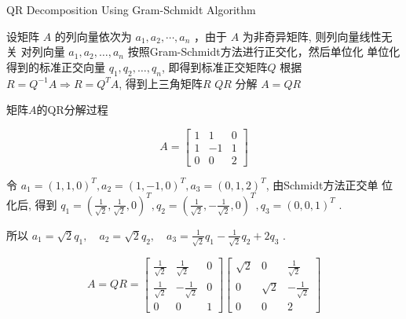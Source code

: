 \begin{algorithm}[htbp]
    \caption{QR Decomposition Using Gram-Schmidt Algorithm}
    
    设矩阵 $ A $ 的列向量依次为 $ a_{1}, a_{2}, \cdots, a_{n} $ ，由于 $ A $ 为非奇异矩阵, 则列向量线性无关\;
    对列向量 $ a_{1}, a_{2}, \ldots, a_{n} $ 按照Gram-Schmidt方法进行正交化，然后单位化\;
    单位化得到的标准正交向量 $ q_{1}, q_{2}, \ldots, q_{n} $, 即得到标准正交矩阵$Q$\;
    根据 $ R=Q^{-1} A \Rightarrow R=Q^{T} A $, 得到上三角矩阵$R$\;
    $ Q R $ 分解 $ A=Q R $\;
\end{algorithm}

\begin{example}
    矩阵$A$的QR分解过程

    $$ A=\left[\begin{array}{ccc}1 & 1 & 0 \\ 1 & -1 & 1 \\ 0 & 0 & 2\end{array}\right] $$

    令 $ a_{1}=(1,1,0)^{T}, a_{2}=(1,-1,0)^{T}, a_{3}=(0,1,2)^{T} $, 由Schmidt方法正交单 位化后, 得到 $ q_{1}=\left(\frac{1}{\sqrt{2}}, \frac{1}{\sqrt{2}}, 0\right)^{T}, q_{2}=\left(\frac{1}{\sqrt{2}},-\frac{1}{\sqrt{2}}, 0\right)^{T}, q_{3}=(0,0,1)^{T} $ .

    所以 $ a_{1}=\sqrt{2} q_{1}, \quad a_{2}=\sqrt{2} q_{2}, \quad a_{3}=\frac{1}{\sqrt{2}} q_{1}-\frac{1}{\sqrt{2}} q_{2}+2 q_{3} $ .

    $$ A=Q R=\left[\begin{array}{ccc}\frac{1}{\sqrt{2}} & \frac{1}{\sqrt{2}} & 0 \\ \frac{1}{\sqrt{2}} & -\frac{1}{\sqrt{2}} & 0 \\ 0 & 0 & 1\end{array}\right]\left[\begin{array}{ccc}\sqrt{2} & 0 & \frac{1}{\sqrt{2}} \\ 0 & \sqrt{2} & -\frac{1}{\sqrt{2}} \\ 0 & 0 & 2\end{array}\right] $$

\end{example}


